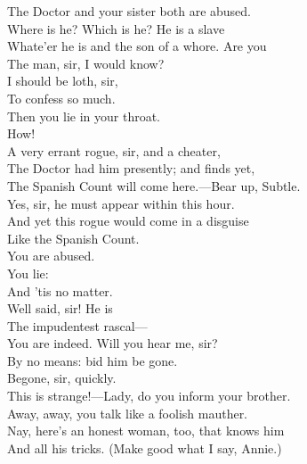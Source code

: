 \documentclass[a4paper,oneside,12pt]{memoir}
\begin{document}
\begin{drama*}
The Doctor and your sister both are abused.\\
\kastrilspeaks Where is he? Which is he? He is a slave\\
Whate'er he is and the son of a whore. Are you\\
The man, sir, I would know?\\
\surlyspeaks {} I should be loth, sir,\\
To confess so much.\\
\kastrilspeaks {} Then you lie in your throat.\\
\surlyspeaks {} How!\\
\facespeaks A very errant rogue, sir, and a cheater,\\
The Doctor had him presently; and finds yet,\\
The Spanish Count will come here.---Bear up, Subtle.\\
\subtlespeaks Yes, sir, he must appear within this hour.\\
\facespeaks And yet this rogue would come in a disguise\\
Like the Spanish Count.\\
\surlyspeaks {} You are abused.\\
\kastrilspeaks {} You lie:\\
And 'tis no matter.\\
\facespeaks {} Well said, sir! He is\\
The impudentest rascal---\\
\surlyspeaks {} You are indeed. Will you hear me, sir?\\
\facespeaks By no means: bid him be gone.\\
\kastrilspeaks {} Begone, sir, quickly.\\
\surlyspeaks This is strange!---Lady, do you inform your brother.\\
\kastrilspeaks Away, away, you talk like a foolish mauther.\\
\facespeaks Nay, here's an honest woman, too, that knows him\\
And all his tricks. (Make good what I say, Annie.)\\

\end{drama*}
\end{document}
